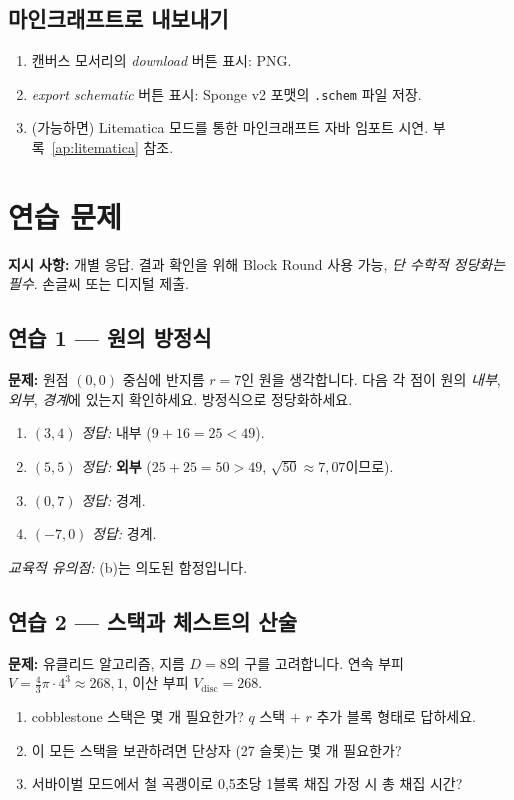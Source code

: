 \documentclass[12pt,a4paper]{scrartcl}
\newcommand{\acc}[1]{\textcolor{accent}{\textbf{#1}}}
\begin{document}
\subsection{마인크래프트로 내보내기}
\begin{enumerate}[leftmargin=1.5em,itemsep=0.15em,topsep=0.3em]
  \item 캔버스 모서리의 \emph{download} 버튼 표시: PNG.
  \item \emph{export schematic} 버튼 표시: Sponge v2 포맷의 \texttt{.schem} 파일 저장.
  \item (가능하면) Litematica 모드를 통한 마인크래프트 자바 임포트 시연. 부록~\ref{ap:litematica} 참조.
\end{enumerate}

\newpage
\section{연습 문제}\label{ap:exerc}

\textbf{지시 사항:} 개별 응답. 결과 확인을 위해 Block Round 사용 가능, \emph{단 수학적 정당화는 필수}. 손글씨 또는 디지털 제출.

\subsection*{연습 1 --- 원의 방정식}
\textbf{문제:} 원점 $(0, 0)$ 중심에 반지름 $r = 7$인 원을 생각합니다. 다음 각 점이 원의 \emph{내부}, \emph{외부}, \emph{경계}에 있는지 확인하세요. 방정식으로 정당화하세요.
\begin{enumerate}[label=\alph*),leftmargin=1.5em,itemsep=0.1em,topsep=0.2em,nosep]
  \item $(3, 4)$ \hfill \emph{정답:} 내부 ($9 + 16 = 25 < 49$).
  \item $(5, 5)$ \hfill \emph{정답:} \acc{외부} ($25 + 25 = 50 > 49$, $\sqrt{50} \approx 7{,}07$이므로).
  \item $(0, 7)$ \hfill \emph{정답:} 경계.
  \item $(-7, 0)$ \hfill \emph{정답:} 경계.
\end{enumerate}

\textit{교육적 유의점:} (b)는 의도된 함정입니다.

\subsection*{연습 2 --- 스택과 체스트의 산술}
\textbf{문제:} 유클리드 알고리즘, 지름 $D = 8$의 구를 고려합니다. 연속 부피 $V = \tfrac{4}{3}\pi \cdot 4^3 \approx 268{,}1$, 이산 부피 $V_{\mathrm{disc}} = 268$.
\begin{enumerate}[label=\alph*),leftmargin=1.5em,itemsep=0.1em,topsep=0.2em,nosep]
  \item cobblestone 스택은 몇 개 필요한가? $q$ 스택 $+$ $r$ 추가 블록 형태로 답하세요.
  \item 이 모든 스택을 보관하려면 단상자 (27 슬롯)는 몇 개 필요한가?
  \item 서바이벌 모드에서 철 곡괭이로 0{,}5초당 1블록 채집 가정 시 총 채집 시간?
\end{enumerate}
\end{document}
